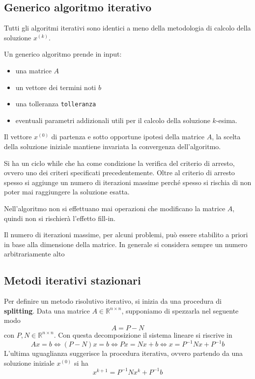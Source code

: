 \subsection{Generico algoritmo iterativo}
Tutti gli algoritmi iterativi sono identici a meno della metodologia di calcolo
della soluzione $x^{(k)}$.

Un generico algoritmo prende in input:
\begin{itemize}
    \item una matrice $A$
    \item un vettore dei termini noti $b$
    \item una tolleranza \texttt{tolleranza}
    \item eventuali parametri addizionali utili per il calcolo della soluzione 
    $k$-esima.
\end{itemize}

Il vettore $x^{(0)}$ di partenza e sotto opportune ipotesi della matrice $A$, la 
scelta della soluzione iniziale mantiene invariata la convergenza dell'algoritmo.

Si ha un ciclo while che ha come condizione la verifica del criterio di arresto,
ovvero uno dei criteri specificati precedentemente. Oltre al criterio di arresto 
spesso si aggiunge un numero di iterazioni massime perché spesso si rischia di 
non poter mai raggiungere la soluzione esatta.

Nell'algoritmo non si effettuano mai operazioni che modificano la matrice $A$,
quindi non si rischierà l'effetto fill-in.

\begin{nota}
    Il numero di iterazioni massime, per alcuni problemi, può essere stabilito
    a priori in base alla dimensione della matrice. In generale si considera
    sempre un numero arbitrariamente alto
\end{nota}




\subsection{Metodi iterativi stazionari}
Per definire un metodo risolutivo iterativo, si inizia da una procedura di \textbf{splitting}.
Data una matrice $A\in \mathbb{R}^{n\times n}$, supponiamo di spezzarla nel seguente 
modo
$$A=P-N$$
con $P,N\in \mathbb{R}^{n\times n}$. Con questa decomposizione il sistema lineare 
si riscrive in
$$Ax= b \iff (P-N)x= b \iff Px = Nx+b \iff x= P^{-1}Nx+P^{-1}b$$
L'ultima uguaglianza suggerisce la procedura iterativa, ovvero partendo da una 
soluzione iniziale $x^{(0)}$ si ha
\begin{equation}
    x^{k+1} =  P^{-1}Nx^{k}+P^{-1}b
    \label{eq:iterativo_stazionario}
\end{equation}

